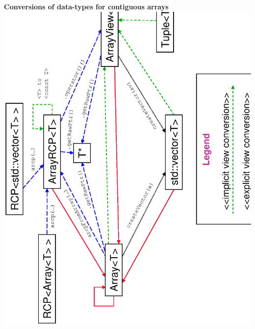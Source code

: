 \begin{center}
{}\textbf{Conversions of data-types for contiguous arrays}
\includegraphics*[angle=270,scale=0.65]{TeuchosArrayConversions}

\pagebreak



\pagebreak



\end{center}

